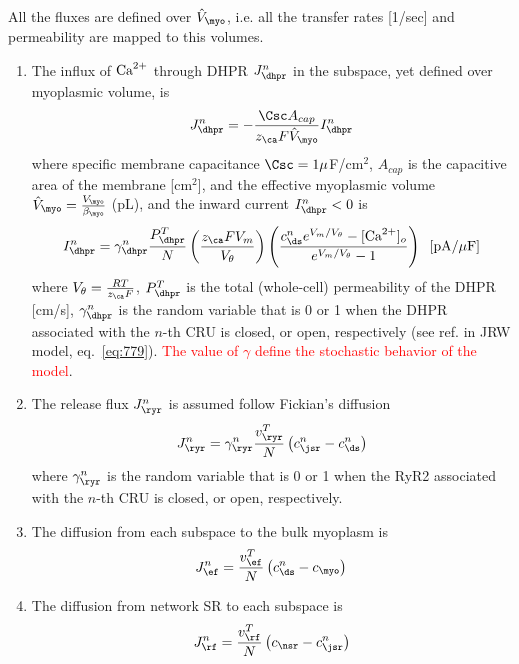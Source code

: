 All the fluxes are defined over $\hat{V}_\myo$, i.e. all the transfer
rates [1/sec] and permeability are mapped to this volumes.
\begin{enumerate}
\item The influx of ${\text{Ca}^{2+}}$ through DHPR $J^n_\dhpr$ in the subspace,
  yet defined over myoplasmic volume, is
  \begin{equation}
    \label{eq:1015}
    J^n_\dhpr = -\frac{\Csc A_{cap}}{z_\ca F \hat{V}_\myo}I^n_\dhpr
  \end{equation}
  where specific membrane capacitance $\Csc = 1\mu$F/cm$^2$, $A_{cap}$
  is the capacitive area of the membrane [cm$^2$], and the effective
  myoplasmic volume $\hat{V}_\myo = \frac{V_\myo}{\beta_\myo}$ (pL), and
  the inward current $I^n_\dhpr<0$ is
  \begin{equation}
    \label{eq:1016}
    I^n_\dhpr = \gamma^n_\dhpr \frac{P^T_\dhpr}{N}\left(\frac{z_\ca
        FV_m}{V_\theta}\right) \left( \frac{c^n_\ds
        e^{V_m/V_\theta}-[\Ca]_o}{e^{V_m/V_\theta}-1}\right)  \;\;\text{[pA/$\mu$F]}
  \end{equation}
  where $V_\theta = \frac{RT}{z_\ca F}$, $P^T_\dhpr$ is the total
  (whole-cell) permeability of the DHPR [cm/s], $\gamma^n_\dhpr$ is the
  random variable that is 0 or 1 when the DHPR associated with the
  $n$-th CRU is closed, or open, respectively (see ref. in JRW model,
  eq.~\eqref{eq:779}).
  \textcolor{red}{The value of $\gamma$ define the stochastic behavior
    of the model}.

\item The release flux $J^n_\ryr$ is assumed follow Fickian's diffusion
  \begin{equation}
    \label{eq:1017}
    J^n_\ryr = \gamma^n_\ryr \frac{v^T_\ryr}{N}\left( c^n_\jsr-c^n_\ds\right)
  \end{equation}
  where $\gamma^n_\ryr$ is the random variable that is 0 or 1 when the
  RyR2 associated with the $n$-th CRU is closed, or open, respectively.


\item 
  The diffusion from each subspace to the bulk myoplasm is
  \begin{equation}
    \label{eq:1018}
    J^n_\ef =  \frac{v^T_\ef}{N}\left( c^n_\ds-c_\myo \right)
  \end{equation}


\item The diffusion from network SR to each subspace is
  \begin{equation}
    \label{eq:1019}
    J^n_\rf =  \frac{v^T_\rf}{N}\left( c_\nsr-c^n_\jsr \right)
  \end{equation}



\end{enumerate}
